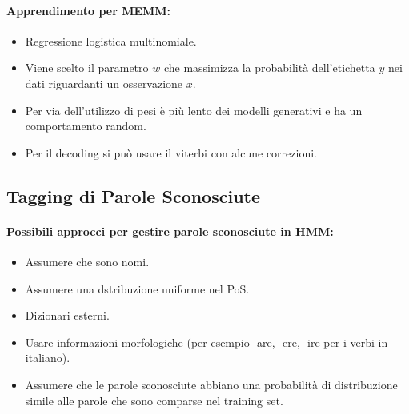 \paragraph{Apprendimento per MEMM:}

\begin{itemize}
  \item Regressione logistica multinomiale. 
  \item Viene scelto il parametro $w$ che massimizza la probabilità dell'etichetta $y$ nei dati riguardanti un osservazione $x$.
  \item Per via dell'utilizzo di pesi è più lento dei modelli generativi e ha un comportamento random.
  \item Per il decoding si può usare il viterbi con alcune correzioni.
\end{itemize}







\subsection{Tagging di Parole Sconosciute}

\paragraph{Possibili approcci per gestire parole sconosciute in HMM:}

\begin{itemize}
  \item Assumere che sono nomi. 
  \item Assumere una dstribuzione uniforme nel PoS. 
  \item Dizionari esterni. 
  \item Usare informazioni morfologiche (per esempio -are, -ere, -ire per i verbi in italiano). 
  \item Assumere che le parole sconosciute abbiano una probabilità di distribuzione simile alle parole che sono comparse nel training set.
\end{itemize}

